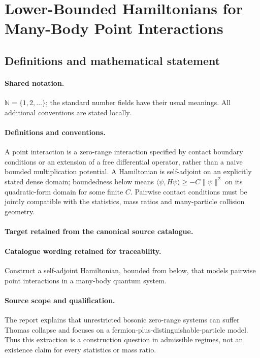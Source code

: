\documentclass[11pt]{article}
\begin{document}
\section{Lower-Bounded Hamiltonians for Many-Body Point Interactions}\label{statement}

\subsection{Definitions and mathematical statement}

\paragraph{Shared notation.}$\mathbb N=\{1,2,\ldots\}$; the standard number fields have their usual meanings. All additional conventions are stated locally.


\paragraph{Definitions and conventions.}
A point interaction is a zero-range interaction specified by contact boundary conditions or an extension of a free differential operator, rather than a naive bounded multiplication potential. A Hamiltonian is self-adjoint on an explicitly stated dense domain; boundedness below means $\langle\psi,H\psi\rangle\geq-C\|\psi\|^2$ on its quadratic-form domain for some finite $C$. Pairwise contact conditions must be jointly compatible with the statistics, mass ratios and many-particle collision geometry.

\paragraph{Target retained from the canonical source catalogue.}
\paragraph{Catalogue wording retained for traceability.}
Construct a self-adjoint Hamiltonian, bounded from below, that models pairwise point interactions in a many-body quantum system.

\paragraph{Source scope and qualification.}
The report explains that unrestricted bosonic zero-range systems can suffer Thomas collapse and focuses on a fermion-plus-distinguishable-particle model. Thus this extraction is a construction question in admissible regimes, not an existence claim for every statistics or mass ratio.
\end{document}
